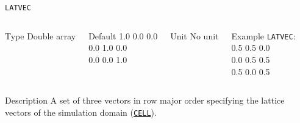 \documentclass[xcolor=dvipsnames,t]{beamer}
\begin{document}
\begin{frame}[allowframebreaks]{\texttt{LATVEC}} \label{LATVEC}
\vspace*{-12pt}
\begin{columns}
\begin{block}{Type}
Double array
\end{block}

\begin{block}{Default}
1.0 0.0 0.0\\
0.0 1.0 0.0\\
0.0 0.0 1.0\\
\end{block}

\begin{block}{Unit}
No unit
\end{block}

\begin{block}{Example}
\texttt{LATVEC}: \\
0.5 0.5 0.0\\
0.0 0.5 0.5\\
0.5 0.0 0.5\\
\end{block}
\end{columns}

\begin{block}{Description}
A set of three vectors in row major order specifying the lattice vectors of the simulation domain (\hyperlink{CELL}{\texttt{CELL}}).
\end{block}


\end{frame}
\end{document}
